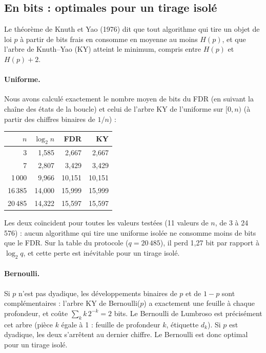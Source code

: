 \documentclass[11pt,a4paper]{article}
\begin{document}
\subsection{En bits : optimales pour un tirage isolé}

Le théorème de Knuth et Yao (1976) dit que tout algorithme qui tire un objet de loi $p$
à partir de bits frais en consomme en moyenne au moins $H(p)$, et que l'arbre de
Knuth--Yao (KY) atteint le minimum, compris entre $H(p)$ et $H(p)+2$.

\paragraph{Uniforme.} Nous avons calculé exactement le nombre moyen de bits du FDR (en
suivant la chaîne des états de la boucle) et celui de l'arbre KY de l'uniforme sur
$[0, n)$ (à partir des chiffres binaires de $1/n$) :
\begin{table}[H]
\centering
\small
\begin{tabular}{rrrr}
\toprule
$n$ & $\log_2 n$ & FDR & KY \\
\midrule
3 & 1,585 & 2,667 & 2,667 \\
7 & 2,807 & 3,429 & 3,429 \\
1\,000 & 9,966 & 10,151 & 10,151 \\
16\,385 & 14,000 & 15,999 & 15,999 \\
20\,485 & 14,322 & 15,597 & 15,597 \\
\bottomrule
\end{tabular}
\end{table}
\noindent Les deux coïncident pour toutes les valeurs testées (11 valeurs de $n$, de 3
à 24\,576) : aucun algorithme qui tire une uniforme isolée ne consomme moins de bits que
le FDR. Sur la table du protocole ($q = 20\,485$), il perd 1,27 bit par rapport à
$\log_2 q$, et cette perte est inévitable pour un tirage isolé.

\paragraph{Bernoulli.} Si $p$ n'est pas dyadique, les développements binaires de $p$ et
de $1-p$ sont complémentaires : l'arbre KY de Bernoulli($p$) a exactement une feuille à
chaque profondeur, et coûte $\sum_k k\,2^{-k} = 2$ bits. Le Bernoulli de Lumbroso est
précisément cet arbre (pièce $k$ égale à 1 : feuille de profondeur $k$, étiquette $d_k$).
Si $p$ est dyadique, les deux s'arrêtent au dernier chiffre. Le Bernoulli est donc
optimal pour un tirage isolé.
\end{document}
